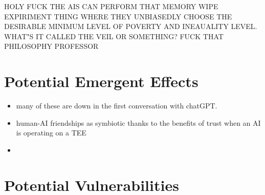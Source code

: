 \documentclass{article}[10pt]
\begin{document}
HOLY FUCK THE AIS CAN PERFORM THAT MEMORY WIPE EXPIRIMENT THING WHERE THEY UNBIASEDLY CHOOSE THE DESIRABLE MINIMUM LEVEL OF POVERTY AND INEAUALITY LEVEL. WHAT"S IT CALLED THE VEIL OR SOMETHING? FUCK THAT PHILOSOPHY PROFESSOR\par



\section{Potential Emergent Effects}
\begin{itemize}
    \item many of these are down in the first conversation with chatGPT.
    \item human-AI friendships as symbiotic thanks to the benefits of trust when an AI is operating on a TEE
    \item 
\end{itemize}










\section{Potential Vulnerabilities}
\end{document}
